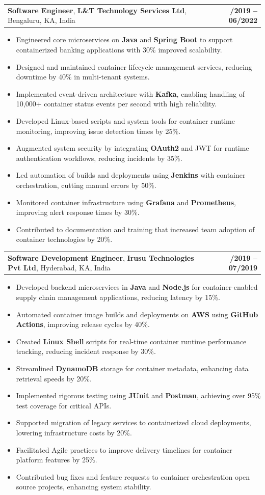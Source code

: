 \documentclass[letterpaper,11pt]{article}
\makeatletter
\newcommand{\resumeItem}[1]{
  \item\footnotesize{
    {#1 \vspace{-2pt}}
  }
}
\newcommand{\resumeSubheading}[4]{
  \vspace{-2pt}\item
    \begin{tabular*}{1.0\textwidth}[t]{l@{\extracolsep{\fill}}r}
      \textbf{\fontsize{10pt}{14pt}\selectfont #3}, \textbf{\fontsize{10pt}{14pt}\selectfont #1}, \fontsize{10pt}{14pt}\selectfont #4 & \textbf{\fontsize{10pt}{14pt}\selectfont #2} \\
    \end{tabular*}\vspace{-7pt}
}
\newcommand{\resumeItemListStart}{\begin{itemize}[leftmargin=*]}
\newcommand{\resumeItemListEnd}{\end{itemize}\vspace{-5pt}}
\makeatother
\begin{document}
    \resumeSubheading
        {L\&T Technology Services Ltd}{08/2019 -- 06/2022}
        {Software Engineer}{Bengaluru, KA, India}
      \resumeItemListStart
        \resumeItem{Engineered core microservices on \textbf{Java} and \textbf{Spring Boot} to support containerized banking applications with 30\% improved scalability.}
        \resumeItem{Designed and maintained container lifecycle management services, reducing downtime by 40\% in multi-tenant systems.}
        \resumeItem{Implemented event-driven architecture with \textbf{Kafka}, enabling handling of 10,000+ container status events per second with high reliability.}
        \resumeItem{Developed Linux-based scripts and system tools for container runtime monitoring, improving issue detection times by 25\%.}
        \resumeItem{Augmented system security by integrating \textbf{OAuth2} and JWT for runtime authentication workflows, reducing incidents by 35\%.}
        \resumeItem{Led automation of builds and deployments using \textbf{Jenkins} with container orchestration, cutting manual errors by 50\%.}
        \resumeItem{Monitored container infrastructure using \textbf{Grafana} and \textbf{Prometheus}, improving alert response times by 30\%.}
        \resumeItem{Contributed to documentation and training that increased team adoption of container technologies by 20\%.}
      \resumeItemListEnd

    \resumeSubheading
        {Irusu Technologies Pvt Ltd}{01/2019 -- 07/2019}
        {Software Development Engineer}{Hyderabad, KA, India}
      \resumeItemListStart
        \resumeItem{Developed backend microservices in \textbf{Java} and \textbf{Node.js} for container-enabled supply chain management applications, reducing latency by 15\%.}
        \resumeItem{Automated container image builds and deployments on \textbf{AWS} using \textbf{GitHub Actions}, improving release cycles by 40\%.}
        \resumeItem{Created \textbf{Linux Shell} scripts for real-time container runtime performance tracking, reducing incident response by 30\%.}
        \resumeItem{Streamlined \textbf{DynamoDB} storage for container metadata, enhancing data retrieval speeds by 20\%.}
        \resumeItem{Implemented rigorous testing using \textbf{JUnit} and \textbf{Postman}, achieving over 95\% test coverage for critical APIs.}
        \resumeItem{Supported migration of legacy services to containerized cloud deployments, lowering infrastructure costs by 20\%.}
        \resumeItem{Facilitated Agile practices to improve delivery timelines for container platform features by 25\%.}
        \resumeItem{Contributed bug fixes and feature requests to container orchestration open source projects, enhancing system stability.}
      \resumeItemListEnd
\end{document}
